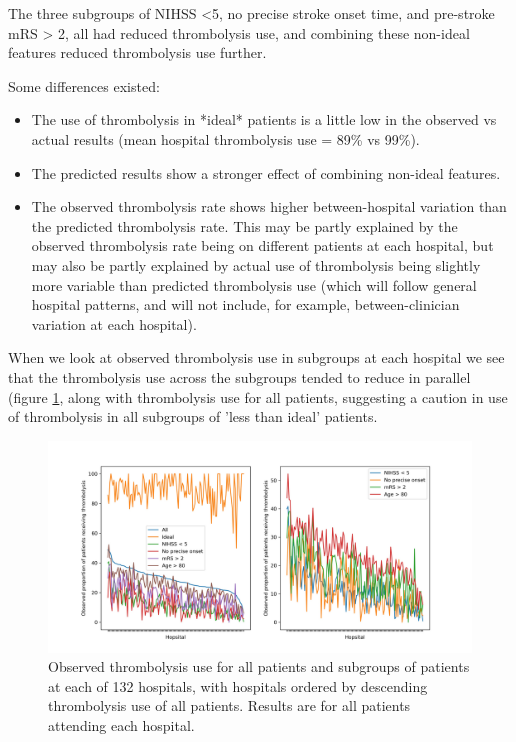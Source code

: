 The three subgroups of NIHSS <5, no precise stroke onset time, and pre-stroke mRS > 2, all had reduced thrombolysis use, and combining these non-ideal features reduced thrombolysis use further.

Some differences existed:

\begin{itemize}
    \item The use of thrombolysis in *ideal* patients is a little low in the observed vs actual results (mean hospital thrombolysis use = 89\% vs 99\%).
    \item The predicted results show a stronger effect of combining non-ideal features.
    \item The observed thrombolysis rate shows higher between-hospital variation than the predicted thrombolysis rate. This may be partly explained by the observed thrombolysis rate being on different patients at each hospital, but may also be partly explained by actual use of thrombolysis being slightly more variable than predicted thrombolysis use (which will follow general hospital patterns, and will not include, for example, between-clinician variation at each hospital).
\end{itemize}

When we look at observed thrombolysis use in subgroups at each hospital we see that the thrombolysis use across the subgroups tended to reduce in parallel (figure \ref{fig:subgroup_rate_1}, along with thrombolysis use for all patients, suggesting a  caution in use of thrombolysis in all subgroups of 'less than ideal' patients. 

\begin{figure}
\centering
\includegraphics[width=1\textwidth]{./images/15a_actual_subgroup}
\caption{Observed thrombolysis use for all patients and subgroups of patients at each of 132 hospitals, with hospitals ordered by descending thrombolysis use of all patients. Results are for all patients attending each hospital.}
\label{fig:subgroup_rate_1}
\end{figure}

